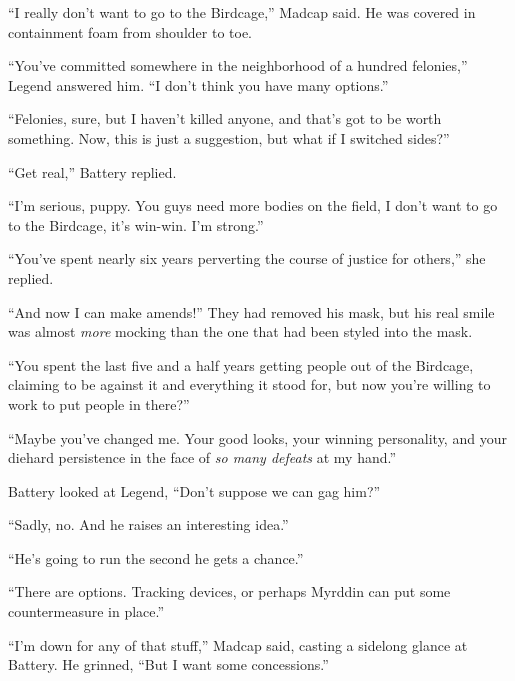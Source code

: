 ``I really don't want to go to the Birdcage,'' Madcap said.  He was covered in containment foam from shoulder to toe.



``You've committed somewhere in the neighborhood of a hundred felonies,'' Legend answered him.  ``I don't think you have many options.''



``Felonies, sure, but I haven't killed anyone, and that's got to be worth something.  Now, this is just a suggestion, but what if I switched sides?''



``Get real,'' Battery replied.



``I'm serious, puppy.  You guys need more bodies on the field, I don't want to go to the Birdcage, it's win-win.  I'm strong.''



``You've spent nearly six years perverting the course of justice for others,'' she replied.



``And now I can make amends!'' They had removed his mask, but his real smile was almost \emph{more} mocking than the one that had been styled into the mask.



``You spent the last five and a half years getting people out of the Birdcage, claiming to be against it and everything it stood for, but now you're willing to work to put people in there?''



``Maybe you've changed me.  Your good looks, your winning personality, and your diehard persistence in the face of \emph{so many defeats} at my hand.''



Battery looked at Legend, ``Don't suppose we can gag him?''



``Sadly, no.  And he raises an interesting idea.''



``He's going to run the second he gets a chance.''



``There are options.  Tracking devices, or perhaps Myrddin can put some countermeasure in place.''



``I'm down for any of that stuff,'' Madcap said, casting a sidelong glance at Battery.  He grinned, ``But I want some concessions.''



